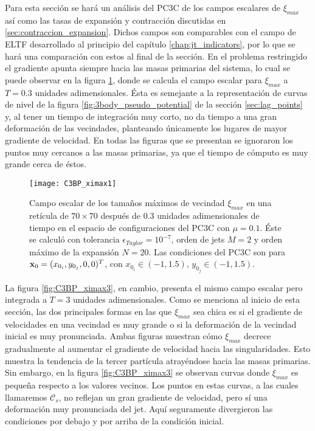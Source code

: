 Para esta sección se hará un análisis del PC3C de los campos escalares de $\xi_{max}$ así como las tasas de expansión y contracción discutidas en \ref{sec:contraccion_expansion}. Dichos campos son comparables con el campo de ELTF desarrollado al principio del capítulo \ref{chap:jt_indicators}, por lo que se hará una comparación con estos al final de la sección. En el problema restringido el gradiente apunta siempre hacia las masas primarias del sistema, lo cual se puede observar en la figura \ref{fig:C3BP_ximax1}, donde se calcula el campo escalar para $\xi_{max}$ a $T = 0.3$ unidades adimensionales. Ésta es semejante a la representación de curvas de nivel de la figura \ref{fig:3body_pseudo_potential} de la sección \ref{sec:lag_points} y, al tener un tiempo de integración muy corto, no da tiempo a una gran deformación de las vecindades, planteando únicamente los lugares de mayor gradiente de velocidad. En todas las figuras que se presentan se ignoraron los puntos muy cercanos a las masas primarias, ya que el tiempo de cómputo es muy grande cerca de éstos. 

\begin{figure}
 \centering
 \texttt{[image: C3BP\_ximax1]}
 \caption{Campo escalar de los tamaños máximos de vecindad $\xi_{max}$ en una retícula de $70 \times 70$  después de $0.3$ unidades adimensionales de tiempo en el espacio de configuraciones del PC3C con $\mu = 0.1$. Éste se calculó con tolerancia $\epsilon_{Taylor} = 10^{-7}$, orden de jets $M = 2$ y orden máximo de la expansión $N = 20$. Las condiciones del PC3C son para $\mathbf{x}_0 = (x_{0_i}, y_{0_j}, 0, 0)^T$, con $x_{0_i} \in (-1, 1.5)$, $y_{0_j} \in (-1, 1.5)$.}
 \label{fig:C3BP_ximax1}
\end{figure}

La figura \ref{fig:C3BP_ximax3}, en cambio, presenta el mismo campo escalar pero integrada a $T = 3$ unidades adimensionales. Como se menciona al inicio de esta sección, las dos principales formas en las que $\xi_{max}$ sea chica es si el gradiente de velocidades en una vecindad es muy grande o si la deformación de la vecindad inicial es muy pronunciada. Ambas figuras muestran cómo $\xi_{max}$ decrece gradualmente al aumentar el gradiente de velocidad hacia las singularidades. Esto muestra la tendencia de la tercer partícula atrayéndose hacia las masas primarias. Sin embargo, en la figura \ref{fig:C3BP_ximax3} se observan curvas donde $\xi_{max}$ es pequeña  respecto a los valores vecinos. Los puntos en estas curvas, a las cuales llamaremos $\mathcal{C}_s$, no reflejan un gran gradiente de velocidad, pero sí una deformación muy pronunciada del jet. Aquí seguramente divergieron las condiciones por debajo y por arriba de la condición inicial. 

